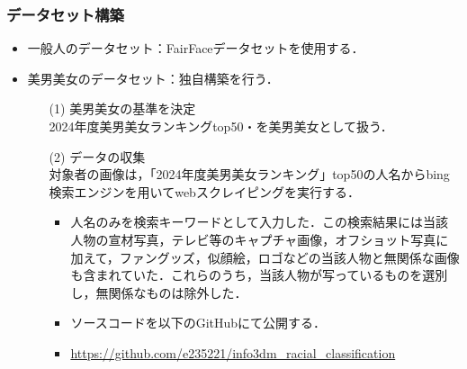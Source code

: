 \documentclass[a4paper,11pt,titlepage]{jsarticle}
\begin{document}
\subsubsection{データセット構築}
\begin{itemize}
    \item 一般人のデータセット：FairFaceデータセットを使用する．
    \item 美男美女のデータセット：独自構築を行う．
        \begin{itemize}
            \item[(1)] 美男美女の基準を決定 \\
                2024年度美男美女ランキングtop50\cite{bidanshi}・\cite{bijoshi}を美男美女として扱う．
            \item[(2)] データの収集 \\
                対象者の画像は，「2024年度美男美女ランキング」top50の人名からbing検索エンジンを用いてwebスクレイピングを実行する．
                \begin{itemize}
                	\item	人名のみを検索キーワードとして入力した．この検索結果には当該人物の宣材写真，テレビ等のキャプチャ画像，オフショット写真に加えて，ファングッズ，似顔絵，ロゴなどの当該人物と無関係な画像も含まれていた．これらのうち，当該人物が写っているものを選別し，無関係なものは除外した．
                    \item ソースコードを以下のGitHubにて公開する．
                    \item \url{https://github.com/e235221/info3dm_racial_classification}
                \end{itemize}
        \end{itemize}
\end{itemize}
    
\end{document}
